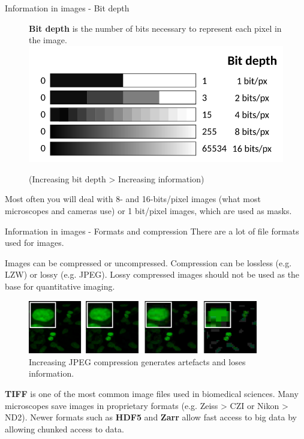 \documentclass[9pt, aspectratio=169]{beamer}
\begin{document}
\begin{frame}
	{Information in images - Bit depth}
	\begin{figure}
		\textbf{Bit depth} is the number of bits necessary to represent each pixel in the image.
		\centering
		\includegraphics[width=.8\textwidth]{bitdepth.png}
		\caption{(Increasing bit depth > Increasing information)}
	\end{figure}

	Most often you will deal with 8- and 16-bits/pixel images (what most microscopes and cameras use) or 1 bit/pixel images, which are used as masks.
\end{frame}

\begin{frame}
	{Information in images - Formats and compression}
	There are a lot of file formats used for images.

	Images can be compressed or uncompressed. Compression can be lossless (e.g. LZW) or lossy (e.g. JPEG). Lossy compressed images should not be used as the base for quantitative imaging.
	\begin{figure}
		\centering
		\includegraphics[width=380px]{compression.png}
		\caption{Increasing JPEG compression generates artefacts and loses information.}
	\end{figure}

	\pause
	\textbf{TIFF} is one of the most common image files used in biomedical sciences. Many microscopes save images in proprietary formats (e.g. Zeiss > CZI or Nikon > ND2). Newer formats such as \textbf{HDF5} and \textbf{Zarr} allow fast access to big data by allowing chunked access to data.
\end{frame}
\end{document}

